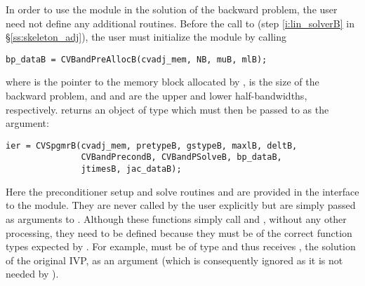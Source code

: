In order to use the {\cvbandpre} module in the solution of the backward problem,
the user need not define any additional routines. Before the call to 
(step \ref{i:lin_solverB} in \S\ref{ss:skeleton_adj}), the user must initialize the
{\cvbandpre} module by calling
\begin{verbatim}
bp_dataB = CVBandPreAllocB(cvadj_mem, NB, muB, mlB);
\end{verbatim}
where  is the pointer to the memory block allocated by
,  is the size of the backward problem, and 
and  are the upper and lower half-bandwidths, respectively. 
 returns an object of type  which must
then be passed to  as the  argument:
\begin{verbatim}
ier = CVSpgmrB(cvadj_mem, pretypeB, gstypeB, maxlB, deltB,
               CVBandPrecondB, CVBandPSolveB, bp_dataB,
               jtimesB, jac_dataB);
\end{verbatim}
Here the preconditioner setup and solve routines  and 
 are provided in the interface to the {\cvbandpre} module.
They are never called by the user explicitly but are simply passed as arguments
to . 
Although these functions simply call  and ,
without any other processing, they need to be defined because they must be
of the correct function types expected by . For example,
 must be of type  and thus receives
, the solution of the original IVP, as an argument 
(which is consequently ignored as it is not needed by {\cvbandpre}).
